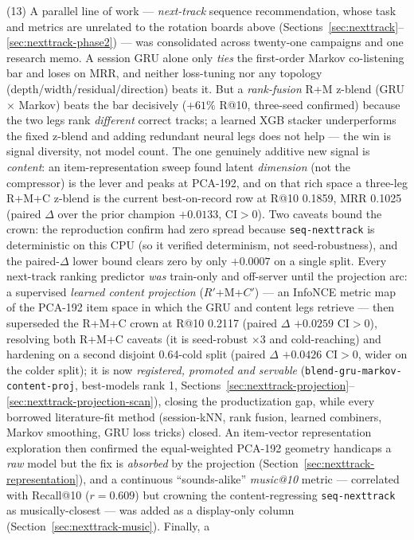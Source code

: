 \documentclass[11pt]{article}
\newcommand{\Rp}{\ensuremath{R'}}
\newcommand{\Cp}{\ensuremath{C'}}
\begin{document}
(13) A parallel line of work --- \emph{next-track} sequence recommendation, whose task and metrics are unrelated to the rotation boards above (Sections~\ref{sec:nexttrack}--\ref{sec:nexttrack-phase2}) --- was consolidated across twenty-one campaigns and one research memo. A session GRU alone only \emph{ties} the first-order Markov co-listening bar and loses on MRR, and neither loss-tuning nor any topology (depth/width/residual/direction) beats it. But a \emph{rank-fusion} R+M z-blend (GRU $\times$ Markov) beats the bar decisively ($+61\%$ R@10, three-seed confirmed) because the two legs rank \emph{different} correct tracks; a learned XGB stacker underperforms the fixed z-blend and adding redundant neural legs does not help --- the win is signal diversity, not model count. The one genuinely additive new signal is \emph{content}: an item-representation sweep found latent \emph{dimension} (not the compressor) is the lever and peaks at PCA-192, and on that rich space a three-leg R+M+C z-blend is the current best-on-record row at R@10 \num{0.1859}, MRR \num{0.1025} (paired $\Delta$ over the prior champion $+\num{0.0133}$, CI$>$0). Two caveats bound the crown: the reproduction confirm had zero spread because \texttt{seq-nexttrack} is deterministic on this CPU (so it verified determinism, not seed-robustness), and the paired-$\Delta$ lower bound clears zero by only $+\num{0.0007}$ on a single split. Every next-track ranking predictor \emph{was} train-only and off-server until the projection arc: a supervised \emph{learned content projection} (\Rp+M+\Cp) --- an InfoNCE metric map of the PCA-192 item space in which the GRU and content legs retrieve --- then superseded the R+M+C crown at R@10 \num{0.2117} (paired $\Delta$ $+\num{0.0259}$ CI$>$0), resolving both R+M+C caveats (it is seed-robust $\times$3 and cold-reaching) and hardening on a second disjoint 0.64-cold split (paired $\Delta$ $+\num{0.0426}$ CI$>$0, wider on the colder split); it is now \emph{registered, promoted and servable} (\texttt{blend-gru-markov-content-proj}, best-models rank 1, Sections~\ref{sec:nexttrack-projection}--\ref{sec:nexttrack-projection-scan}), closing the productization gap, while every borrowed literature-fit method (session-kNN, rank fusion, learned combiners, Markov smoothing, GRU loss tricks) closed. An item-vector representation exploration then confirmed the equal-weighted PCA-192 geometry handicaps a \emph{raw} model but the fix is \emph{absorbed} by the projection (Section~\ref{sec:nexttrack-representation}), and a continuous ``sounds-alike'' \emph{music@10} metric --- correlated with Recall@10 ($r=\num{0.609}$) but crowning the content-regressing \texttt{seq-nexttrack} as musically-closest --- was added as a display-only column (Section~\ref{sec:nexttrack-music}). Finally, a
\end{document}
